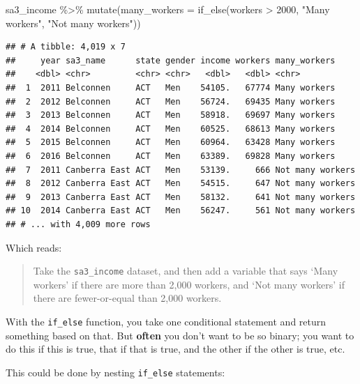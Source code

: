 \documentclass[
]{book}
\newenvironment{Shaded}{\begin{snugshade}}{\end{snugshade}}
\newcommand{\AttributeTok}[1]{\textcolor[rgb]{0.77,0.63,0.00}{#1}}
\newcommand{\DecValTok}[1]{\textcolor[rgb]{0.00,0.00,0.81}{#1}}
\newcommand{\FunctionTok}[1]{\textcolor[rgb]{0.00,0.00,0.00}{#1}}
\newcommand{\NormalTok}[1]{#1}
\newcommand{\SpecialCharTok}[1]{\textcolor[rgb]{0.00,0.00,0.00}{#1}}
\newcommand{\StringTok}[1]{\textcolor[rgb]{0.31,0.60,0.02}{#1}}
\begin{document}
\begin{Shaded}
\begin{Highlighting}[]
\NormalTok{sa3\_income }\SpecialCharTok{\%\textgreater{}\%} 
  \FunctionTok{mutate}\NormalTok{(}\AttributeTok{many\_workers =} \FunctionTok{if\_else}\NormalTok{(workers }\SpecialCharTok{\textgreater{}} \DecValTok{2000}\NormalTok{, }\StringTok{"Many workers"}\NormalTok{, }\StringTok{"Not many workers"}\NormalTok{))}
\end{Highlighting}
\end{Shaded}

\begin{verbatim}
## # A tibble: 4,019 x 7
##     year sa3_name      state gender income workers many_workers    
##    <dbl> <chr>         <chr> <chr>   <dbl>   <dbl> <chr>           
##  1  2011 Belconnen     ACT   Men    54105.   67774 Many workers    
##  2  2012 Belconnen     ACT   Men    56724.   69435 Many workers    
##  3  2013 Belconnen     ACT   Men    58918.   69697 Many workers    
##  4  2014 Belconnen     ACT   Men    60525.   68613 Many workers    
##  5  2015 Belconnen     ACT   Men    60964.   63428 Many workers    
##  6  2016 Belconnen     ACT   Men    63389.   69828 Many workers    
##  7  2011 Canberra East ACT   Men    53139.     666 Not many workers
##  8  2012 Canberra East ACT   Men    54515.     647 Not many workers
##  9  2013 Canberra East ACT   Men    58132.     641 Not many workers
## 10  2014 Canberra East ACT   Men    56247.     561 Not many workers
## # ... with 4,009 more rows
\end{verbatim}

Which reads:

\begin{quote}
Take the \texttt{sa3\_income} dataset, and then add a variable that says `Many workers' if there are more than 2,000 workers, and `Not many workers' if there are fewer-or-equal than 2,000 workers.
\end{quote}

With the \texttt{if\_else} function, you take one conditional statement and return something based on that. But \textbf{often} you don't want to be so binary; you want to do this if this is true, that if that is true, and the other if the other is true, etc.

This could be done by nesting \texttt{if\_else} statements:
\end{document}
